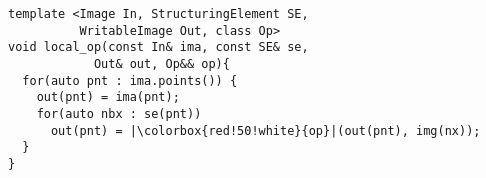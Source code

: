 \documentclass[varwidth=8cm, border={0.1cm 0.1cm 0.1cm 0.1cm}]{standalone}
\begin{document}
\begin{verbatim}
template <Image In, StructuringElement SE,
          WritableImage Out, class Op>
void local_op(const In& ima, const SE& se,
            Out& out, Op&& op){
  for(auto pnt : ima.points()) {
    out(pnt) = ima(pnt);
    for(auto nbx : se(pnt))
      out(pnt) = |\colorbox{red!50!white}{op}|(out(pnt), img(nx));
  }
}
\end{verbatim}
\end{document}
